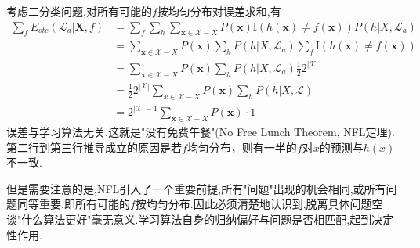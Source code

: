 考虑二分类问题,对所有可能的$f$按均匀分布对误差求和,有
\begin{equation}\begin{split}
\sum_fE_{ote}(\mathcal L_a|\mathbf X,f)&=\sum_f\sum_h\sum_{\mathbf x\in\mathcal X-X}P(\mathbf x)\text{I}(h(\mathbf x)\ne f(\mathbf x))P(h|X,\mathcal L_a)\\
&=\sum_{\mathbf x\in\mathcal X-X}P(\mathbf x)\sum_hP(h|X,\mathcal L_a)\sum_f\text{I}(h(\mathbf x)\ne f(\mathbf x))\\
&=\sum_{\mathbf x\in\mathcal X-X}P(\mathbf x)\sum_hP(h|X,\mathcal L_a)\frac{1}{2}2^{|\mathcal X|}\\
&=\frac{1}{2}2^{|\mathcal X|}\sum_{x\in\mathcal X-X}P(\mathbf x)\sum_hP(h|X,\mathcal L)\\
&=2^{|\mathcal X|-1}\sum_{\mathbf x\in\mathcal X-X}P(\mathbf x)\cdot 1
\end{split}\end{equation}
误差与学习算法无关,这就是"没有免费午餐"(No Free Lunch Theorem, NFL定理).第二行到第三行推导成立的原因是若$f$均匀分布，则有一半的$f$对$x$的预测与$h(x)$不一致.

但是需要注意的是,NFL引入了一个重要前提,所有"问题"出现的机会相同,或所有问题同等重要,即所有可能的$f$按均匀分布.因此必须清楚地认识到,脱离具体问题空谈"什么算法更好"毫无意义.学习算法自身的归纳偏好与问题是否相匹配,起到决定性作用.